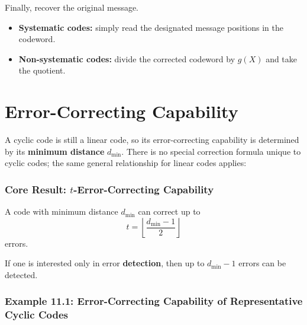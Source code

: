 \documentclass[11pt,oneside]{book}
\providecommand{\tightlist}{\setlength{\itemsep}{0pt}\setlength{\parskip}{0pt}}
\theoremstyle{plain}
\theoremstyle{definition}
\theoremstyle{remark}
\begin{document}
Finally, recover the original message.

\begin{itemize}
\tightlist
\item
  \textbf{Systematic codes:} simply read the designated message
  positions in the codeword.
\item
  \textbf{Non-systematic codes:} divide the corrected codeword by
  \(g(X)\) and take the quotient.
\end{itemize}


\section{Error-Correcting Capability}\label{sec:error-correcting-capability}

A cyclic code is still a linear code, so its error-correcting capability
is determined by its \textbf{minimum distance} \(d_{\min}\). There is no
special correction formula unique to cyclic codes; the same general
relationship for linear codes applies:

\subsubsection{\texorpdfstring{Core Result: \(t\)-Error-Correcting
Capability}{Core Result: t-Error-Correcting Capability}}\label{core-result-t-error-correcting-capability}

A code with minimum distance \(d_{\min}\) can correct up to
\[t = \left\lfloor \frac{d_{\min}-1}{2} \right\rfloor\] errors.

If one is interested only in error \textbf{detection}, then up to
\(d_{\min}-1\) errors can be detected.

\subsubsection{Example 11.1: Error-Correcting Capability of
Representative Cyclic
Codes}\label{example-11.1-error-correcting-capability-of-representative-cyclic-codes}
\end{document}
